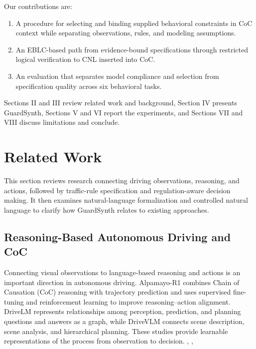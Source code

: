 \documentclass[nolineno]{ieeeaccess}
\begin{document}
Our contributions are:\par

\begin{enumerate}
\item A procedure for selecting and binding supplied behavioral constraints in CoC context while separating observations, rules, and modeling assumptions.
\item An EBLC-based path from evidence-bound specifications through restricted logical verification to CNL inserted into CoC.
\item An evaluation that separates model compliance and selection from specification quality across six behavioral tasks.
\end{enumerate}

Sections II and III review related work and background, Section IV presents GuardSynth, Sections V and VI report the experiments, and Sections VII and VIII discuss limitations and conclude.\par

\section{Related Work}

This section reviews research connecting driving observations, reasoning, and actions, followed by traffic-rule specification and regulation-aware decision making. It then examines natural-language formalization and controlled natural language to clarify how GuardSynth relates to existing approaches.\par

\subsection{Reasoning-Based Autonomous Driving and CoC}

Connecting visual observations to language-based reasoning and actions is an important direction in autonomous driving. Alpamayo-R1 combines Chain of Causation (CoC) reasoning with trajectory prediction and uses supervised fine-tuning and reinforcement learning to improve reasoning--action alignment. DriveLM represents relationships among perception, prediction, and planning questions and answers as a graph, while DriveVLM connects scene description, scene analysis, and hierarchical planning. These studies provide learnable representations of the process from observation to decision. \cite{r1}, \cite{r2}, \cite{r3}\par
\end{document}
